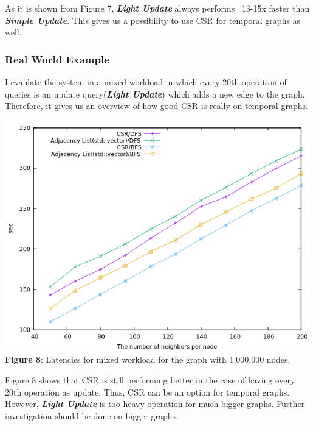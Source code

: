 \documentclass{article}
\begin{document}
 As it is shown from Figure 7, \textbf{\textit{Light Update}} always performs ~13-15x faster than \textbf{\textit{Simple Update}}. This gives us a possibility to use CSR for temporal graphs as well.
 
 \subsubsection*{Real World Example}
 I evaulate the system in a mixed workload in which every 20th operation of queries is an update query(\textbf{\textit{Light Update}}) which adds a new edge to the graph. Therefore, it gives us an overview of how good CSR is really on temporal graphs.
 \begin{center}
\includegraphics[scale = 0.5]{mixed_workload}\\
\textbf{Figure 8}: Latencies for mixed workload for the graph with 1,000,000 nodes.
\end{center}
 Figure 8 shows that CSR is still performing better in the case of having every 20th operation as update. Thus, CSR can be an option for temporal graphs. However, \textbf{\textit{Light Update}} is too heavy operation for much bigger graphs. Further investigation should be done on bigger graphs.
 
\end{document}

